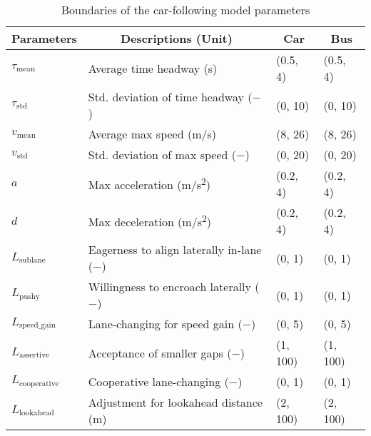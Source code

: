 \begin{table}[ht]
\centering
\caption{Boundaries of the car-following model parameters}
\label{tab:parameter_bounds}
\begin{tabular}{p{1.2cm}p{4.5cm}p{0.9cm}p{0.9cm}}
\toprule
\multicolumn{1}{c}{\textbf{Parameters}} & \multicolumn{1}{c}{\textbf{Descriptions (Unit)}} & \multicolumn{1}{c}{\textbf{Car}} & \multicolumn{1}{c}{\textbf{Bus}} \\
\midrule                 
$\tau_{\text{mean}}$ & Average time headway (\si{\second}) & (0.5, 4) & (0.5, 4) \\
$\tau_{\text{std}}$ & Std. deviation of time headway ($-$)  & (0, 10) & (0, 10) \\
$v_{\text{mean}}$ & Average max speed (\si{\meter/\second}) & (8, 26) & (8, 26) \\
$v_{\text{std}}$ & Std. deviation of max speed ($-$) & (0, 20) & (0, 20) \\
$a$ & Max acceleration (\si{\meter/\second^{2}}) & (0.2, 4)  & (0.2, 4) \\
$d$ & Max deceleration  (\si{\meter/\second^{2}}) & (0.2, 4) & (0.2, 4) \\
$L_{\text{sublane}}$ & Eagerness to align laterally in-lane ($-$) & (0, 1) & (0, 1) \\
$L_{\text{pushy}}$ & Willingness to encroach laterally ($-$) & (0, 1) & (0, 1) \\
$L_{\text{speed\_gain}}$ & Lane-changing for speed gain ($-$) & (0, 5) & (0, 5) \\
$L_{\text{assertive}}$ & Acceptance of smaller gaps ($-$) & (1, 100) & (1, 100) \\
$L_{\text{cooperative}}$ & Cooperative lane-changing ($-$) & (0, 1) & (0, 1) \\
$L_{\text{lookahead}}$ & Adjustment for lookahead distance (\si{\meter}) & (2, 100) & (2, 100) \\
\bottomrule
\end{tabular}
\end{table}